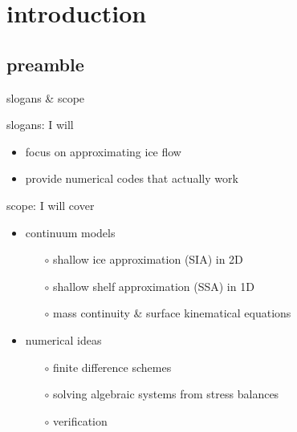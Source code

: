 
\section{introduction}

\subsection{preamble}

\begin{frame}{slogans \& scope}

slogans: I will
  \begin{itemize}
  \item \alert{focus on approximating ice flow}
  \item \alert{provide numerical codes that actually work}
  \end{itemize}
\medskip

scope: I will cover
  \begin{itemize}
  \item continuum models

    \begin{itemize}
    \item[$\circ$] shallow ice approximation (SIA) in 2D
    \item[$\circ$] shallow shelf approximation (SSA) in 1D
    \item[$\circ$] mass continuity \& surface kinematical equations
    \end{itemize}

  \item numerical ideas

    \begin{itemize}
    \item[$\circ$] finite difference schemes
    \item[$\circ$] solving algebraic systems from stress balances
    \item[$\circ$] verification
    \end{itemize}
  \end{itemize}
\end{frame}


